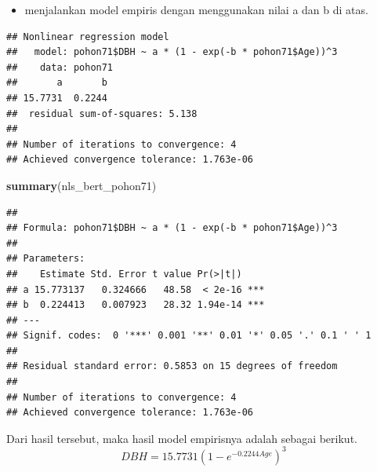 \documentclass[
  12pt,
  a4paper,
]{scrbook}
\newenvironment{Shaded}{\begin{snugshade}}{\end{snugshade}}
\newcommand{\DataTypeTok}[1]{\textcolor[rgb]{0.13,0.29,0.53}{#1}}
\newcommand{\DecValTok}[1]{\textcolor[rgb]{0.00,0.00,0.81}{#1}}
\newcommand{\FloatTok}[1]{\textcolor[rgb]{0.00,0.00,0.81}{#1}}
\newcommand{\KeywordTok}[1]{\textcolor[rgb]{0.13,0.29,0.53}{\textbf{#1}}}
\newcommand{\NormalTok}[1]{#1}
\newcommand{\OperatorTok}[1]{\textcolor[rgb]{0.81,0.36,0.00}{\textbf{#1}}}
\newcommand{\StringTok}[1]{\textcolor[rgb]{0.31,0.60,0.02}{#1}}
\providecommand{\tightlist}{%
  \setlength{\itemsep}{0pt}\setlength{\parskip}{0pt}}
\begin{document}
\begin{itemize}
\tightlist
\item
  menjalankan model empiris dengan menggunakan nilai a dan b di atas.
\end{itemize}

\begin{Shaded}
\end{Shaded}

\begin{verbatim}
## Nonlinear regression model
##   model: pohon71$DBH ~ a * (1 - exp(-b * pohon71$Age))^3
##    data: pohon71
##       a       b 
## 15.7731  0.2244 
##  residual sum-of-squares: 5.138
## 
## Number of iterations to convergence: 4 
## Achieved convergence tolerance: 1.763e-06
\end{verbatim}

\newpage

\begin{Shaded}
\begin{Highlighting}[]
\KeywordTok{summary}\NormalTok{(nls_bert_pohon71)}
\end{Highlighting}
\end{Shaded}

\begin{verbatim}
## 
## Formula: pohon71$DBH ~ a * (1 - exp(-b * pohon71$Age))^3
## 
## Parameters:
##    Estimate Std. Error t value Pr(>|t|)    
## a 15.773137   0.324666   48.58  < 2e-16 ***
## b  0.224413   0.007923   28.32 1.94e-14 ***
## ---
## Signif. codes:  0 '***' 0.001 '**' 0.01 '*' 0.05 '.' 0.1 ' ' 1
## 
## Residual standard error: 0.5853 on 15 degrees of freedom
## 
## Number of iterations to convergence: 4 
## Achieved convergence tolerance: 1.763e-06
\end{verbatim}

Dari hasil tersebut, maka hasil model empirisnya adalah sebagai berikut.
\[ DBH = 15.7731(1-e^{-0.2244 Age})^3 \]
\end{document}
